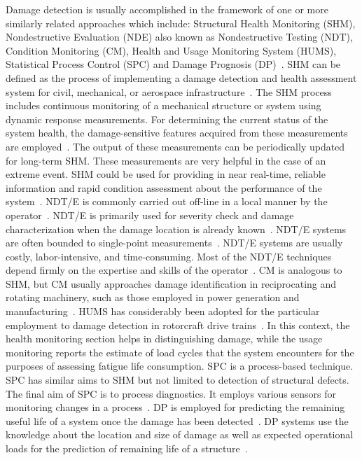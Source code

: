 \documentclass[b5paper, 11pt, titlepage]{book}
\begin{document}
Damage detection is usually accomplished in the framework of one or more similarly related approaches which include: Structural Health Monitoring (SHM), Nondestructive Evaluation (NDE) also known as Nondestructive Testing (NDT), Condition Monitoring (CM), Health and Usage Monitoring System (HUMS), Statistical Process Control (SPC) and Damage Prognosis (DP)~\cite{Farrar2007, Farrar2012}. SHM can be defined as the process of implementing a damage detection and health assessment system for civil, mechanical, or aerospace  infrastructure~\cite{Farrar2007, Farrar2012}. The SHM process includes continuous monitoring of a mechanical structure or system using dynamic response measurements. For determining the current status of the system health, the damage-sensitive features acquired from these measurements are employed~\cite{Farrar2007, Farrar2012}. The output of these measurements can be periodically updated for long-term SHM. These measurements are very helpful in the case of an extreme event. SHM could be used for providing in near real-time, reliable information and rapid condition assessment about the performance of the system~\cite{Farrar2012}. NDT/E is commonly carried out off-line in a local manner by the operator~\cite{stepinski2013advanced, shull2002nondestructive}. NDT/E is primarily used for severity check and damage characterization when the damage location is already known~\cite{Farrar2007,Farrar2012}. NDT/E systems are often bounded to single-point measurements~\cite{stepinski2013advanced}. NDT/E systems are usually costly, labor-intensive, and time-consuming. Most of the NDT/E techniques depend firmly on the expertise and skills of the operator~\cite{jawaid2018structural}. CM is analogous to SHM, but CM usually approaches damage identification in reciprocating and rotating machinery, such as those employed in power generation and manufacturing~\cite{Worden2004}. HUMS has considerably been adopted for the particular employment to damage detection in rotorcraft drive trains~\cite{Samuel2005}. In this context, the health monitoring section helps in distinguishing damage, while the usage monitoring reports the estimate of load cycles that the system encounters for the purposes of assessing fatigue life consumption. SPC is a process-based technique. SPC has similar aims to SHM but not limited to detection of structural defects. The final aim of SPC is to process diagnostics. It employs various sensors for monitoring changes in a process~\cite{stepinski2013advanced, montgomery2009dmaic}. DP is employed for predicting the remaining useful life of a system once the damage has been detected~\cite{farrar2003damage, Farrar2007, Farrar2012}. DP systems use the knowledge about the location and size of damage as well as expected operational loads for the prediction of remaining life of a structure~\cite{stepinski2013advanced}. 
\end{document}
